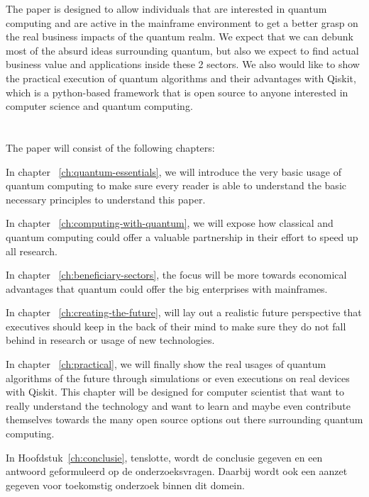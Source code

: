 The paper is designed to allow individuals that are interested in quantum computing and are active in the mainframe environment to get a better grasp on the real business impacts of the quantum realm. We expect that we can debunk most of the absurd ideas surrounding quantum, but also we expect to find actual business value and applications inside these 2 sectors. We also would like to show the practical execution of quantum algorithms and their advantages with Qiskit, which is a python-based framework that is open source to anyone interested in computer science and quantum computing.

\section{}
\label{sec:opzet-bachelorproef}


The paper will consist of the following chapters:

In chapter ~\ref{ch:quantum-essentials}, we will introduce the very basic usage of quantum computing to make sure every reader is able to understand the basic necessary principles to understand this paper.

In chapter ~\ref{ch:computing-with-quantum}, we will expose how classical and quantum computing could offer a valuable partnership in their effort to speed up all research. 

In chapter ~\ref{ch:beneficiary-sectors}, the focus will be more towards economical advantages that quantum could offer the big enterprises with mainframes.

In chapter ~\ref{ch:creating-the-future}, will lay out a realistic future perspective that executives should keep in the back of their mind to make sure they do not fall behind in research or usage of new technologies.

In chapter ~\ref{ch:practical}, we will finally show the real usages of quantum algorithms of the future through simulations or even executions on real devices with Qiskit. This chapter will be designed for computer scientist that want to really understand the technology and want to learn and maybe even contribute themselves towards the many open source options out there surrounding quantum computing.

In Hoofdstuk~\ref{ch:conclusie}, tenslotte, wordt de conclusie gegeven en een antwoord geformuleerd op de onderzoeksvragen. Daarbij wordt ook een aanzet gegeven voor toekomstig onderzoek binnen dit domein.